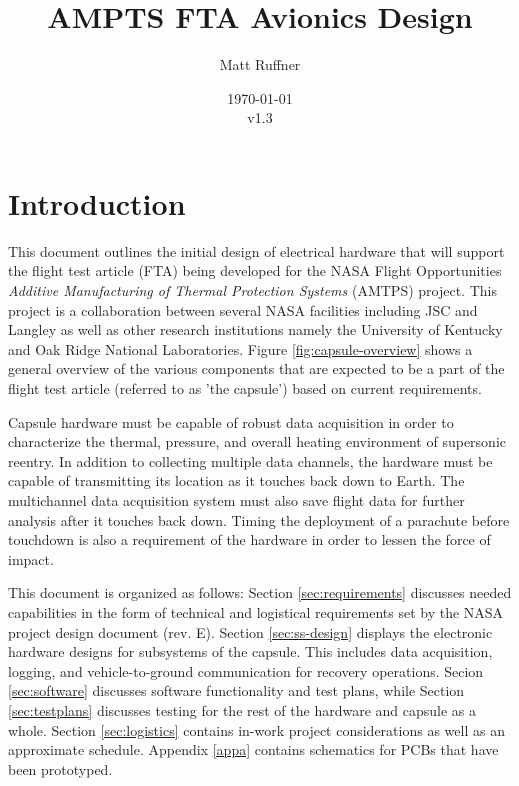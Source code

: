 \documentclass{article}
\title{AMPTS FTA Avionics Design}
\author{Matt Ruffner}
\date{\today\\v1.3}
\newcommand{\ddrev}{E}
\begin{document}
\maketitle
\begin{center}
\end{center}
\tableofcontents \newpage
\listoffigures 
\listoftables \newpage



\section{Introduction}
This document outlines the initial design of electrical hardware that will support the flight test article (FTA) being developed for the NASA Flight Opportunities \textit{Additive Manufacturing of Thermal Protection Systems} (AMTPS) project. This project is a collaboration between several NASA facilities including JSC and Langley as well as other research institutions namely the University of Kentucky and Oak Ridge National Laboratories. Figure \ref{fig:capsule-overview} shows a general overview of the various components that are  expected to be a part of the flight test article (referred to as 'the capsule') based on current requirements.

Capsule hardware must be capable of robust data acquisition in order to characterize the thermal, pressure, and overall heating environment of supersonic reentry. In addition to collecting multiple data channels, the hardware must be capable of transmitting its location as it touches back down to Earth. The multichannel data acquisition system must also save flight data for further analysis after it touches back down. Timing the deployment of a parachute before touchdown is also a requirement of the hardware in order to lessen the force of impact.

This document is organized as follows: Section \ref{sec:requirements} discusses needed capabilities in the form of technical and logistical requirements set by the NASA project design document (rev. \ddrev ). Section \ref{sec:ss-design} displays the electronic hardware designs for subsystems of the capsule. This includes data acquisition, logging, and vehicle-to-ground communication for recovery operations. Secion \ref{sec:software} discusses software functionality and test plans, while Section \ref{sec:testplans} discusses testing for the rest of the hardware and capsule as a whole. Section \ref{sec:logistics} contains in-work project considerations as well as an approximate schedule. Appendix \ref{appa} contains schematics for PCBs that have been prototyped.  
\end{document}
